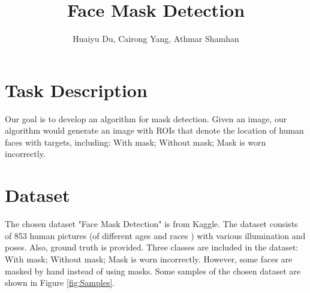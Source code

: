 \documentclass[10pt,a4paper]{report}
\author{Huaiyu Du, Cairong Yang, Athmar Shamhan}
\begin{document}
\title{Face Mask Detection}

\maketitle

\chapter{Task Description}
Our goal is to develop an algorithm for mask detection. Given an image, our algorithm would generate an image with ROIs that denote the location of human faces with targets, including: With mask; Without mask; Mask is worn incorrectly.

\chapter{Dataset}
The chosen dataset "Face Mask Detection" is from Kaggle. The dataset consists of 853 human pictures (of different ages and races ) with various illumination and poses. Also, ground truth is provided. Three classes are included in the dataset: With mask; Without mask; Mask is worn incorrectly. However, some faces are masked by hand instead of using masks. Some samples of the chosen dataset are shown in Figure \ref{fig:Samples}.
\end{document}
